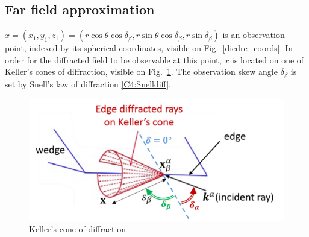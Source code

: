 \subsection{Far field approximation}
$x=(x_1,y_1,z_1)=(r\cos\theta\cos\delta_{\beta},r\sin\theta\cos\delta_{\beta},r\sin\delta_{\beta})$ is an observation point, indexed by its spherical coordinates, visible on Fig.~\ref{diedre_coords}. In order for the diffracted field to be observable at this point, $x$ is located on one of Keller's cones of diffraction, visible on Fig.~\ref{C4:Kellercone}. The observation skew angle $\delta_{\beta}$ is set by Snell's law of diffraction \eqref{C4:Snelldiff}.

\begin{figure}
\centering
\includegraphics[width=\textwidth]{images/chapter4/Keller_annotated.png}
        \caption{Keller's cone of diffraction}
        \label{C4:Kellercone}
\end{figure}

